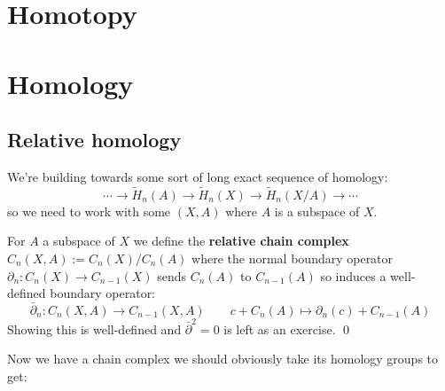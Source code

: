 \documentclass[a4paper]{article}
\begin{document}
\newlength{\edgelentgh}
\setlength{\edgelentgh}{3cm}

\renewcommand*\thesection{\arabic{section}}

\section{Homotopy}










\section{Homology}




\subsection{Relative homology}

We're building towards some sort of long exact sequence of homology:\[
    \cdots \rightarrow \tilde{H}_n(A)\rightarrow \tilde{H}_n(X)\rightarrow \tilde{H}_n(X/A)\rightarrow \cdots
\]
so we need to work with some $(X,A)$ where $A$ is a subspace of $X$.

\begin{definition}
    For $A$ a subspace of $X$ we define the \textbf{relative chain complex} $C_n(X,A):= C_n(X)/C_n(A)$ where the normal boundary operator $\partial_n:C_n(X)\rightarrow C_{n-1}(X)$ sends $C_n(A)$ to $C_{n-1}(A)$ so induces a well-defined boundary operator: \[
        \bar{\partial}_n:C_n(X,A)\rightarrow C_{n-1}(X,A) \qquad c + C_n(A) \mapsto \partial_n(c) + C_{n-1}(A)
    \]
    Showing this is well-defined and $\bar{\partial}^2=0$ is left as an exercise. \qed
\end{definition}
Now we have a chain complex we should obviously take its homology groups to get:
\end{document}
